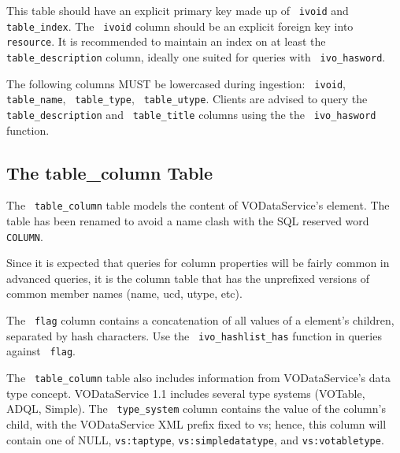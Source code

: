 \documentclass[11pt,a4paper]{ivoa}
\newcommand{\rtent}[1]{\texttt{\color{rtcolor} #1}}
\begin{document}

 

This table should have an explicit primary key made up of
\rtent{ivoid} and \rtent{table\_index}.  The 
\rtent{ivoid} column should be an explicit
foreign key into \rtent{resource}.  It is recommended to
maintain an index on at least the \rtent{table\_description}
column, ideally one suited for queries with \rtent{ivo\_hasword}.

The following columns MUST be lowercased during ingestion:
\rtent{ivoid}, \rtent{table\_name}, \rtent{table\_type},
\rtent{table\_utype}.
Clients are advised to query the \rtent{table\_description}
and \rtent{table\_title}  columns
using the the \rtent{ivo\_hasword} function.



\subsection{The table\_column Table}

\label{table_table_column}

The \rtent{table\_column}  table models the content of VODataService's
 element.  The table has been renamed to avoid
a name clash with the SQL reserved word \texttt{COLUMN}.

Since it is expected that queries for column properties will be
fairly common in advanced queries, it is the column table that has the
unprefixed versions of common member names (name,  ucd,
utype, etc).

The \rtent{flag} column contains a concatenation of all values
of a  element's  children, separated
by hash characters.  Use the \rtent{ivo\_hashlist\_has} function in
queries against \rtent{flag}.

The \rtent{table\_column} table also includes information from
VODataService's data type concept.  VODataService 1.1 includes several type
systems (VOTable, ADQL, Simple).  The
\rtent{type\_system} column contains the value of the column's 
 child, with the VODataService XML prefix fixed
to vs; hence, this column will contain one of NULL,
\texttt{vs:taptype},
\texttt{vs:simpledatatype}, and \texttt{vs:votabletype}.


\end{document}
